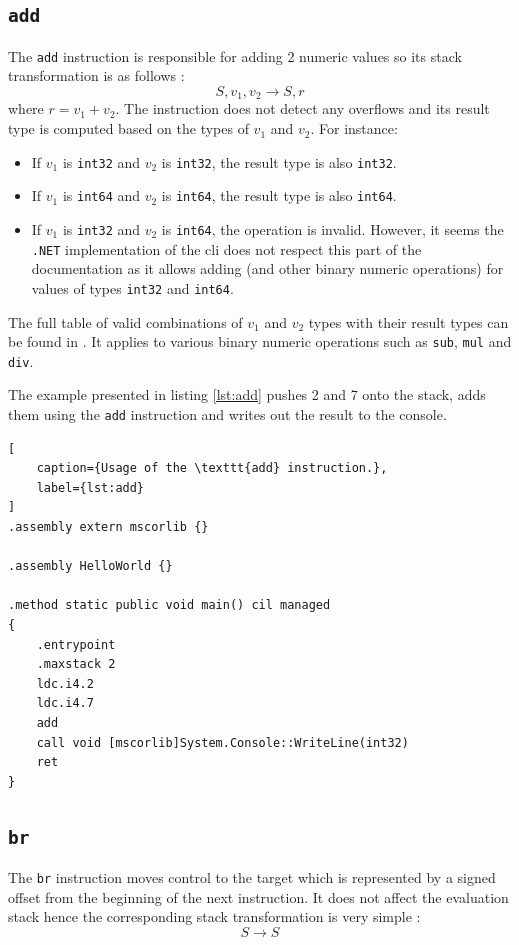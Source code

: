 \documentclass[declaration,shortabstract,english,mgr]{iithesis}
\begin{document}
\subsection{\texttt{add}}

The \texttt{add} instruction is responsible for adding 2 numeric values so its stack transformation is as follows \cite{ecmaStandard}:
$$
	S, v_1, v_2 \rightarrow S, r
$$
where $r = v_1 + v_2$. The instruction does not detect any overflows and its result type is computed based on the types of $v_1$ and $v_2$. For instance:
\begin{itemize}
	\item{If $v_1$ is \texttt{int32} and $v_2$ is \texttt{int32}, the result type is also \texttt{int32}.}
	\item{If $v_1$ is \texttt{int64} and $v_2$ is \texttt{int64}, the result type is also \texttt{int64}.}
	\item{If $v_1$ is \texttt{int32} and $v_2$ is \texttt{int64}, the operation is invalid. However, it seems the \texttt{.NET} implementation of the \acrshort{cli} does not respect this part of the documentation as it allows adding (and other binary numeric operations) for values of types \texttt{int32} and \texttt{int64}.}
\end{itemize}
The full table of valid combinations of $v_1$ and $v_2$ types with their result types can be found in \cite{ecmaStandard}. It applies to various binary numeric operations such as \texttt{sub}, \texttt{mul} and \texttt{div}.

The example presented in listing \ref{lst:add} pushes 2 and 7 onto the stack, adds them using the \texttt{add} instruction and writes out the result to the console.

\begin{lstlisting}[
	caption={Usage of the \texttt{add} instruction.},
	label={lst:add}
]
.assembly extern mscorlib {}

.assembly HelloWorld {}

.method static public void main() cil managed
{
	.entrypoint
	.maxstack 2
	ldc.i4.2
	ldc.i4.7
	add
	call void [mscorlib]System.Console::WriteLine(int32)
	ret
}
\end{lstlisting}

\subsection{\texttt{br}}

The \texttt{br} instruction moves control to the target which is represented by a signed offset from the beginning of the next instruction. It does not affect the evaluation stack hence the corresponding stack transformation is very simple \cite{ecmaStandard}:
$$
	S \rightarrow S
$$
\end{document}
